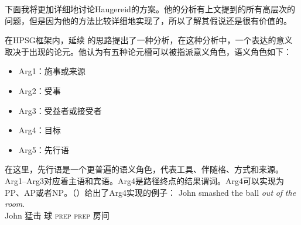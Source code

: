 \begin{exe}
\begin{xlist}[iv.]
\begin{exe}
\begin{xlist}[iv.]
下面我将更加详细地讨论Haugereid\citeyearpar{Haugereid2007a}的方案。他的分析有上文提到的所有高层次的问题，但是因为他的方法比较详细地实现了，所以了解其假说还是很有价值的。

\mbox{} \citet{Haugereid2007a}在HPSG框架内，延续 \citet{Borer2005a-u}的思路提出了一种分析，在这种分析中，一个表达的意义取决于出现的论元。他认为有五种论元槽可以被指派意义角色，语义角色如下：
\begin{itemize}
\item Arg1：施事或来源
\item Arg2：受事
\item Arg3：受益者或接受者
\item Arg4：目标
\item Arg5：先行语
\end{itemize}
在这里，先行语是一个更普遍的语义角色，代表工具、伴随格、方式和来源。Arg1--Arg3对应着主语和宾语。Arg4是路径终点的结果谓词。Arg4可以实现为PP、AP或者NP。（）给出了Arg4实现的例子：
\eal
\ex 
\gll John smashed the ball \emph{out} \emph{of} \emph{the} \emph{room}.\\
     John 猛击  球 \textsc{prep} \textsc{prep}  房间\\

\end{xlist}
\end{exe}
\end{xlist}
\end{exe}
